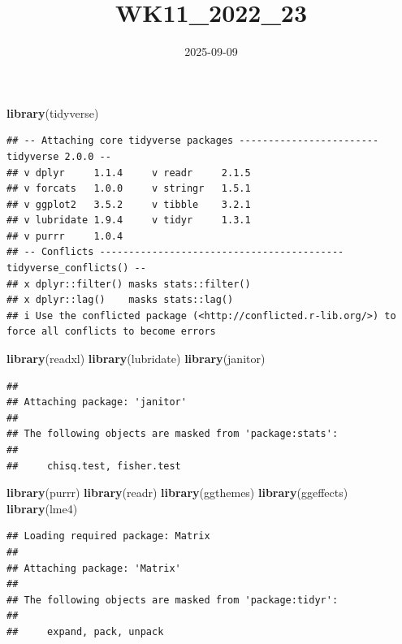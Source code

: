 \documentclass[
]{article}
\title{WK11\_2022\_23}
\author{}
\date{\vspace{-2.5em}2025-09-09}
\newenvironment{Shaded}{\begin{snugshade}}{\end{snugshade}}
\newcommand{\FunctionTok}[1]{\textcolor[rgb]{0.13,0.29,0.53}{\textbf{#1}}}
\newcommand{\NormalTok}[1]{#1}
\begin{document}
\maketitle

\begin{Shaded}
\begin{Highlighting}[]
\FunctionTok{library}\NormalTok{(tidyverse)}
\end{Highlighting}
\end{Shaded}

\begin{verbatim}
## -- Attaching core tidyverse packages ------------------------ tidyverse 2.0.0 --
## v dplyr     1.1.4     v readr     2.1.5
## v forcats   1.0.0     v stringr   1.5.1
## v ggplot2   3.5.2     v tibble    3.2.1
## v lubridate 1.9.4     v tidyr     1.3.1
## v purrr     1.0.4     
## -- Conflicts ------------------------------------------ tidyverse_conflicts() --
## x dplyr::filter() masks stats::filter()
## x dplyr::lag()    masks stats::lag()
## i Use the conflicted package (<http://conflicted.r-lib.org/>) to force all conflicts to become errors
\end{verbatim}

\begin{Shaded}
\begin{Highlighting}[]
\FunctionTok{library}\NormalTok{(readxl)}
\FunctionTok{library}\NormalTok{(lubridate)}
\FunctionTok{library}\NormalTok{(janitor)}
\end{Highlighting}
\end{Shaded}

\begin{verbatim}
## 
## Attaching package: 'janitor'
## 
## The following objects are masked from 'package:stats':
## 
##     chisq.test, fisher.test
\end{verbatim}

\begin{Shaded}
\begin{Highlighting}[]
\FunctionTok{library}\NormalTok{(purrr)}
\FunctionTok{library}\NormalTok{(readr)}
\FunctionTok{library}\NormalTok{(ggthemes)}
\FunctionTok{library}\NormalTok{(ggeffects)}
\FunctionTok{library}\NormalTok{(lme4)}
\end{Highlighting}
\end{Shaded}

\begin{verbatim}
## Loading required package: Matrix
## 
## Attaching package: 'Matrix'
## 
## The following objects are masked from 'package:tidyr':
## 
##     expand, pack, unpack
\end{verbatim}
\end{document}
